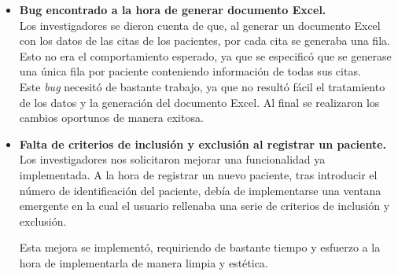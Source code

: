 \begin{itemize}
      \item\textbf{Bug encontrado a la hora de generar documento Excel.} \\
      Los investigadores se dieron cuenta de que, al generar un documento Excel con los datos de las citas de los pacientes, por cada cita se generaba una fila. Esto no era el comportamiento esperado, ya que se especificó que se generase una única fila por paciente conteniendo información de todas sus citas.\\
      
      Este \textit{bug} necesitó de bastante trabajo, ya que no resultó fácil  el tratamiento de los datos y la generación del documento Excel. Al final se realizaron los cambios oportunos de manera exitosa.
      
       \item\textbf{Falta de criterios de inclusión y exclusión al registrar un paciente.} \\
       Los investigadores nos solicitaron mejorar una funcionalidad ya implementada. A la hora de registrar un nuevo paciente, tras introducir el número de identificación del paciente, debía de implementarse una ventana emergente en la cual el usuario rellenaba una serie de criterios de inclusión y exclusión.
       
       Esta mejora se implementó, requiriendo de bastante tiempo y esfuerzo a la hora de implementarla de manera limpia y estética.
      


\end{itemize}


